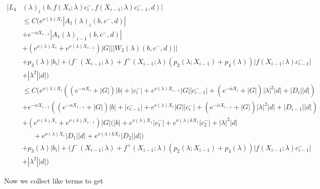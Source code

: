 \documentclass[12pt]{article}
\begin{document}
\begin{enumerate}
\begin{align*}
|L_4&(\lambda)_i(b, f(X_i; \lambda) c_i^-, f(X_{i-1}; \lambda) c_{i-1}^-, d)|\\ 
&\leq C\Big( e^{\nu(\lambda)X_{i}} |A_1(\lambda)_i(b, c^-, d)| \\
&+  e^{-\alpha X_{i-1}} |A_1(\lambda)_{i-1}(b, c^-, d)| \\
&+ (e^{\nu(\lambda)X_i} + e^{\nu(\lambda)X_{i-1}}) |G| ||W_2(\lambda)(b,c^-,d)|| \\
&+ p_3(\lambda) |b_i| + (f^-(X_{i-1}; \lambda) + f^+(X_{i-1}; \lambda) (p_2(\lambda; X_{i-1}) + p_4(\lambda)) | f(X_{i-1}; \lambda) c_{i-1}^-| \\
&+|\lambda^2| |d|) \\
&\leq C\Big( e^{\nu(\lambda)X_{i}} ((e^{-\alpha X_i} + |G|) |b| 
+ |c_i^-| + e^{\nu(\lambda)X_{i-1}} |G||c_{i-1}^-| + (e^{-\tilde{\alpha} X_i} + |G|) |\lambda|^2 |d| + |D_i||d|)\\
&+  e^{-\alpha X_{i-1}} ((e^{-\alpha X_{i-1}} + |G|) |b| 
+ |c_{i-1}^-| + e^{\nu(\lambda)X_i} |G||c_i^-| + (e^{-\tilde{\alpha} X_{i-1}} + |G|) |\lambda|^2 |d| + |D_{i-1}||d|) \\
&+ (e^{\nu(\lambda)X_i} + e^{\nu(\lambda)X_{i-1}}) |G| ( |b| + e^{\nu(\lambda) X_1} |c_1^-| +  e^{\nu(\lambda) k X_1} |c_2^-| + |\lambda|^2 |d| \\
&\:\:\:\:\:\:\:+ e^{\nu(\lambda) X_1} |D_1| |d| + e^{\nu(\lambda) k X_1} |D_2| |d| ) \\
&+ p_3(\lambda) |b_i| + (f^-(X_{i-1}; \lambda) + f^+(X_{i-1}; \lambda) (p_2(\lambda; X_{i-1}) + p_4(\lambda)) | f(X_{i-1}; \lambda) c_{i-1}^-| \\
&+|\lambda^2| |d|)
\end{align*}

Now we collect like terms to get


\end{enumerate}
\end{document}
